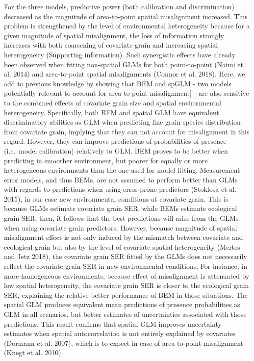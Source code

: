 \documentclass[
  12pt,
  a4paper]{article}
\begin{document}
For the three models, predictive power (both calibration and discrimination) decreased as the magnitude of area-to-point spatial misalignment increased. This problem is strengthened by the level of environmental heterogeneity because for a given magnitude of spatial misalignment, the loss of information strongly increases with both coarsening of covariate grain and increasing spatial heterogeneity (Supporting information). Such synergistic effects have already been observed when fitting non-spatial GLMs for both point-to-point (Naimi et al. 2014) and area-to-point spatial misalignments (Connor et al. 2018). Here, we add to previous knowledge by showing that BEM and spGLM - two models potentially relevant to account for area-to-point misalignment{]} - are also sensitive to the combined effects of covariate grain size and spatial environmental heterogeneity. Specifically, both BEM and spatial GLM have equivalent discriminatory abilities as GLM when predicting fine grain species distribution from covariate grain, implying that they can not account for misalignment in this regard. However, they can improve predictions of probabilities of presence (i.e.~model calibration) relatively to GLM. BEM proves to be better when predicting in smoother environment, but poorer for equally or more heterogeneous environments than the one used for model fitting. Measurement error models, and thus BEMs, are not assumed to perform better than GLMs with regards to predictions when using error-prone predictors (Stoklosa et al. 2015), in our case new environmental conditions at covariate grain. This is because GLMs estimate covariate grain SER, while BEMs estimate ecological grain SER; then, it follows that the best predictions will arise from the GLMs when using covariate grain predictors. However, because magnitude of spatial misalignment effect is not only induced by the mismatch between covariate and ecological grain but also by the level of covariate spatial heterogeneity (Mertes and Jetz 2018), the covariate grain SER fitted by the GLMs does not necessarily reflect the covariate grain SER in new environmental conditions. For instance, in more homogeneous environments, because effect of misalignment is attenuated by low spatial heterogeneity, the covariate grain SER is closer to the ecological grain SER, explaining the relative better performance of BEM in those situations. The spatial GLM produces equivalent mean predictions of presence probabilities as GLM in all scenarios, but better estimates of uncertainties associated with those predictions. This result confirms that spatial GLM improves uncertainty estimates when spatial autocorrelation is not entirely explained by covariates (Dormann et al. 2007), which is to expect in case of area-to-point misalignment (Knegt et al. 2010).
\end{document}
